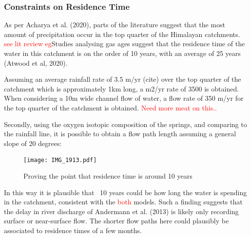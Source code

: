 \newpage


\subsubsection{Constraints on Residence Time}

As per Acharya et al. (2020), parts of the literature suggest that the most amount of precipitation occur in the top quarter of the Himalayan catchments. \textcolor{red}{see lit review eg}Studies analysing gas ages %
suggest that the residence time of the water in this catchment is on the order of 10 years, with an average of 25 years (Atwood et al, 2020). 

\bsk

Assuming an average rainfall rate of 3.5 m/yr (cite) over the top quarter of the catchment which is approximately 1km long, a m2/yr rate of 3500 is obtained. When considering a 10m wide channel flow of water, a flow rate of 350 m/yr for the top quarter of the catchment is obtained. \textcolor{red}{Need more meat on this..}

\bsk

Secondly, using the oxygen isotopic composition of the springs, and comparing to the rainfall line, it is possible to obtain a flow path length assuming a general slope of 20 degrees:



\begin{figure}[h]
    \centering
    \texttt{[image: IMG\_1913.pdf]}
    \caption{Proving the point that residence time is around 10 years}
    \label{fig:discussion7}
\end{figure}

\FloatBarrier




In this way it is plausible that ~10 years could be how long the water is spending in the catchment, consistent with the \textcolor{red}{both} models. Such a finding suggests that the delay in river discharge of Andermann et al. (2013) is likely only recording surface or near-surface flow. The shorter flow paths here could plausibly be associated to residence times of a few months. 

